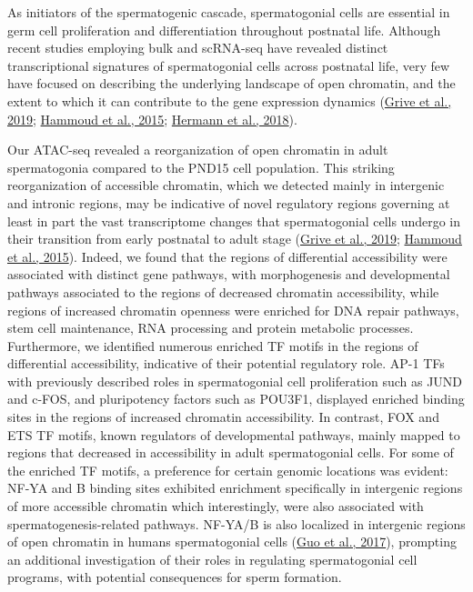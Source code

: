 \documentclass[12pt,twoside]{reedthesis}
\begin{document}
As initiators of the spermatogenic cascade, spermatogonial cells are
essential in germ cell proliferation and differentiation throughout
postnatal life. Although recent studies employing bulk and scRNA-seq
have revealed distinct transcriptional signatures of spermatogonial
cells across postnatal life, very few have focused on describing the
underlying landscape of open chromatin, and the extent to which it can
contribute to the gene expression dynamics (\protect\hyperlink{ref-grive2019}{Grive et al., 2019}; \protect\hyperlink{ref-hammoud2015}{Hammoud et al., 2015}; \protect\hyperlink{ref-hermann2018}{Hermann et al., 2018}).

Our ATAC-seq revealed a reorganization of open chromatin in adult
spermatogonia compared to the PND15 cell population. This striking
reorganization of accessible chromatin, which we detected mainly in
intergenic and intronic regions, may be indicative of novel regulatory
regions governing at least in part the vast transcriptome changes that
spermatogonial cells undergo in their transition from early postnatal to
adult stage (\protect\hyperlink{ref-grive2019}{Grive et al., 2019}; \protect\hyperlink{ref-hammoud2015}{Hammoud et al., 2015}). Indeed, we found that the
regions of differential accessibility were associated with distinct gene
pathways, with morphogenesis and developmental pathways associated to
the regions of decreased chromatin accessibility, while regions of
increased chromatin openness were enriched for DNA repair pathways, stem
cell maintenance, RNA processing and protein metabolic processes.
Furthermore, we identified numerous enriched TF motifs in the regions of
differential accessibility, indicative of their potential regulatory
role. AP-1 TFs with previously described roles in spermatogonial cell
proliferation such as JUND and c-FOS, and pluripotency factors such as
POU3F1, displayed enriched binding sites in the regions of increased
chromatin accessibility. In contrast, FOX and ETS TF motifs, known
regulators of developmental pathways, mainly mapped to regions that
decreased in accessibility in adult spermatogonial cells. For some of
the enriched TF motifs, a preference for certain genomic locations was
evident: NF-YA and B binding sites exhibited enrichment specifically in
intergenic regions of more accessible chromatin which interestingly,
were also associated with spermatogenesis-related pathways. NF-YA/B is
also localized in intergenic regions of open chromatin in humans
spermatogonial cells (\protect\hyperlink{ref-guo2017}{Guo et al., 2017}), prompting an additional investigation
of their roles in regulating spermatogonial cell programs, with
potential consequences for sperm formation.
\end{document}
